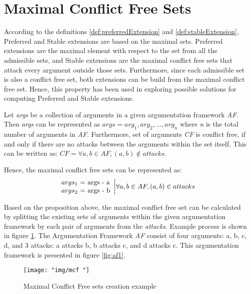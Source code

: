 \section{Maximal Conflict Free Sets} \label{section:maxConflictFreeSet}
According to the definitions \ref{def:preferredExtension} and \ref{def:stableExtension}, Preferred and Stable extensions are based on the maximal sets. Preferred extensions are the maximal element with respect to the set from all the admissible sets, and Stable extensions are the maximal conflict free sets that attack every argument outside those sets. Furthermore, since each admissible set is also a conflict free set, both extensions can be build from the maximal conflict free set. Hence, this property has been used in exploring possible solutions for computing Preferred and Stable extensions.

Let \textit{args} be a collection of arguments in a given argumentation framework \textit{AF}. Then \textit{args} can be represented as $args=arg_1, arg_2,...,arg_n$ where \textit{n} is the total number of arguments in \textit{AF}. 
Furthermore, set of arguments \textit{CF} is conflict free, if and only if there are no attacks between the arguments within the set itself. This can be written as: $CF = \forall a,b \in AF, (a, b) \notin attacks$.

Hence, the maximal conflict free sets can be represented as:
\begin{equation}
\begin{array}{lr}
args_1 $ = $ \text{args} $ - $ \text{a} \\
args_2 $ = $ \text{args} $ - $ \text{b} \\
\end{array} \bigg| \forall a, b \in AF, (a,b) \in attacks
\end{equation}

Based on the proposition above, the maximal conflict free set can be calculated by splitting the existing sets of arguments within the given argumentation framework by each pair of arguments from the \textit{attacks}. Example process is shown in figure \ref{fig:mcfExample}. The Argumentation Framework \textit{AF} consist of four arguments: a, b, c, d, and 3 attacks: a attacks b, b attacks c, and d attacks c. This argumentation framework is presented in figure \ref{fig:af1}. 

\begin{figure}[h]
	\centering
	\texttt{[image: "img/mcf "]}
	\caption{Maximal Conflict Free sets creation example}
	\label{fig:mcfExample}
\end{figure}

